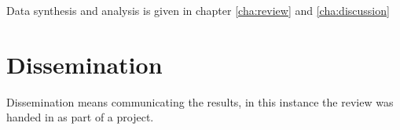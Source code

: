 \documentclass[a4paper]{book}
\begin{document}
Data synthesis and analysis is given in chapter \ref{cha:review} and \ref{cha:discussion}
\section{Dissemination}
Dissemination means communicating the results, in this instance the review was handed in as part
of a project.






\end{document}
